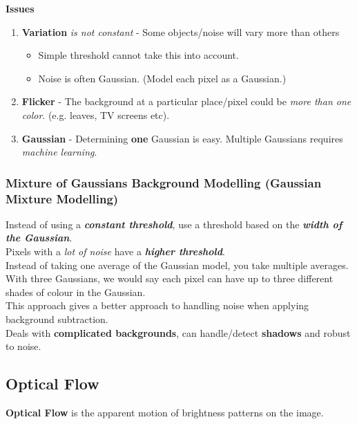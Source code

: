 \documentclass[english, 10pt]{article}
\begin{document}
\textbf{Issues}

\begin{enumerate}
\item \textbf{Variation} \textit{is not constant} - Some objects/noise will vary more than others
\begin{itemize}
\item Simple threshold cannot take this into account.
\item Noise is often Gaussian. (Model each pixel as a Gaussian.)
\end{itemize}
\item \textbf{Flicker} - The background at a particular place/pixel could be \textit{more than one color}. (e.g. leaves, TV screens etc).
\item \textbf{Gaussian} - Determining \textbf{one} Gaussian is easy. Multiple Gaussians requires \textit{machine learning}.
\end{enumerate}

\subsubsection{Mixture of Gaussians Background Modelling (Gaussian Mixture Modelling)}

 Instead of using a \textbf{\textit{constant threshold}}, use a threshold based on the \textit{\textbf{width of the Gaussian}}.\\

 Pixels with a \textit{lot of noise} have a \textbf{\textit{higher threshold}}. \\
  
 Instead of taking one average of the Gaussian model, you take multiple averages. \\
 
 With three Gaussians, we would say each pixel can have up to three different shades of colour in the Gaussian.\\
 
 This approach gives a better approach to handling noise when applying background subtraction. \\

 Deals with \textbf{complicated backgrounds}, can handle/detect \textbf{shadows} and robust to noise.


\subsection{Optical Flow}

 \textbf{Optical Flow} is the apparent motion of brightness patterns on the image. \\
 
\end{document}
